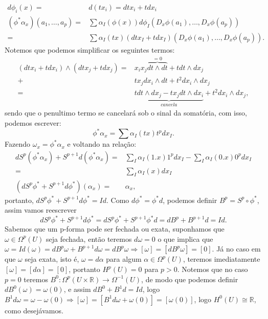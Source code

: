 \documentclass{article}
\begin{document}
	$$
	\begin{aligned}
	d\phi_{i}(x) =& d(tx_{i}) = dtx_{i} + tdx_{i} 
	\\
	(\phi^{*}\alpha_{x})(a_{1},\dots,a_{p}) =& \sum \alpha_{I}(\phi(x))d\phi_{I}(D_{x}\phi(a_{1}),\dots, D_{x}\phi(a_{p}))
	\\
	=& \sum \alpha_{I}(tx)(dtx_{I} + tdx_{I})(D_{x}\phi(a_{1}),\dots, D_{x}\phi(a_{p})).
	\end{aligned}
	$$
	Notemos que podemos simplificar os seguintes termos: 
	$$
	\begin{aligned}
	(dtx_{i} + tdx_{i}) \wedge (dtx_{j} + tdx_{j}) =& x_{i}x_{j} \overbrace{ dt \wedge dt}^{=0} + tdt \wedge dx_{j} 
	\\
	+& tx_{j}dx_{i}\wedge dt + t^{2} dx_{i} \wedge dx_{j}
	\\
	=& \underbrace{ tdt \wedge dx_{j} - tx_{j} dt \wedge dx_{i} }_{cancela}+ t^{2} dx_{i} \wedge dx_{j},
	\end{aligned}
	$$
	sendo que o penultimo termo se cancelará sob o sinal da somatória, com isso, podemos escrever: 
	$$
	\phi^{*}\alpha_{x} = \sum \alpha_{I}(tx) t^{p} dx_{I}.
	$$
	Fazendo $\omega_{x} = \phi^{*}\alpha_{x}$ e voltando na relação:
	$$
	\begin{aligned}
	dS^{p}(\phi^{*}\alpha_{x}) + S^{p+1}d(\phi^{*}\alpha_{x}) 
	=& \sum_{I} \alpha_{I}(1.x) 1^{p} dx_{I} - \sum_{I} \alpha_{I}(0.x) 0^{p} dx_{I}
	\\
	=& \sum_{I} \alpha_{I}(x) dx_{I}
	\\
	(dS^{p}\phi^{*} + S^{p+1}d\phi^{*})(\alpha_{x}) =& \alpha_{x},
	\end{aligned}$$
	portanto, $dS^{p}\phi^{*} + S^{p+1}d\phi^{*} = Id$. Como $d\phi^{*} = \phi^{*}d$, podemos definir $B^{p} = S^{p}\circ\phi^{*}$, assim vamos reescrever
	$$
	dS^{p}\phi^{*} + S^{p+1}d\phi^{*} = dS^{p}\phi^{*} + S^{p+1}\phi^{*}d = dB^{p} + B^{p+1}d = Id.
	$$
	Sabemos que um p-forma pode ser fechada ou exata, suponhamos que $\omega \in \Omega^{p}(U)$ seja fechada, então teremos $d\omega = 0$ o que implica que $\omega = Id(\omega) = dB^{p}\omega + B^{p+1}d\omega = dB^{p}\omega \Rightarrow [\omega] = [dB^{p}\omega] = [0]$. Já no caso em que $\omega$ seja exata, isto é, $\omega = d\alpha$ para algum $\alpha \in \Omega^{p}(U)$, teremos imediatamente $[\omega] =[d\alpha] = [0]$, portanto $H^{p}(U) = 0$ para $p>0$. Notemos que no caso $p=0$ teremos $B^{0} :\Omega^{p}(U \times \mathbb{R}) \to \Omega^{-1}(U)$, de modo que podemos definir $dB^{0}(\omega) = \omega(0)$, e assim $dB^{0} + B^{1}d = Id$, logo $B^{1}d\omega = \omega - \omega(0) \Rightarrow [\omega] = [B^{1}d\omega + \omega(0)] = [\omega(0)]$, logo $H^{0}(U) \cong \mathbb{R}$, como desejávamos.
	
\end{document}
